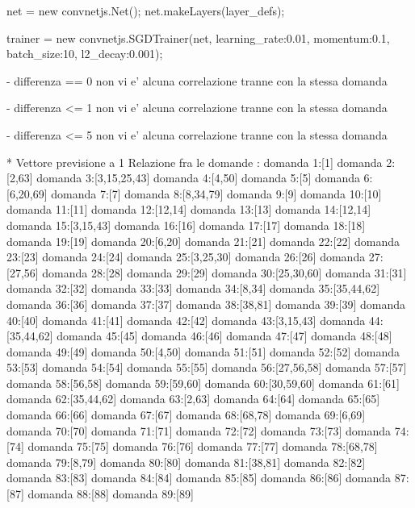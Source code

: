 net = new convnetjs.Net();
net.makeLayers(layer_defs);

trainer = new convnetjs.SGDTrainer(net, {learning_rate:0.01, momentum:0.1, batch_size:10, l2_decay:0.001});

- differenza == 0  non vi e' alcuna correlazione tranne con la stessa domanda

- differenza <= 1  non vi e' alcuna correlazione tranne con la stessa domanda

- differenza <= 5  non vi e' alcuna correlazione tranne con la stessa domanda


* Vettore previsione a 1
Relazione fra le domande :
domanda 1:[1]
domanda 2:[2,63]
domanda 3:[3,15,25,43]
domanda 4:[4,50]
domanda 5:[5]
domanda 6:[6,20,69]
domanda 7:[7]
domanda 8:[8,34,79]
domanda 9:[9]
domanda 10:[10]
domanda 11:[11]
domanda 12:[12,14]
domanda 13:[13]
domanda 14:[12,14]
domanda 15:[3,15,43]
domanda 16:[16]
domanda 17:[17]
domanda 18:[18]
domanda 19:[19]
domanda 20:[6,20]
domanda 21:[21]
domanda 22:[22]
domanda 23:[23]
domanda 24:[24]
domanda 25:[3,25,30]
domanda 26:[26]
domanda 27:[27,56]
domanda 28:[28]
domanda 29:[29]
domanda 30:[25,30,60]
domanda 31:[31]
domanda 32:[32]
domanda 33:[33]
domanda 34:[8,34]
domanda 35:[35,44,62]
domanda 36:[36]
domanda 37:[37]
domanda 38:[38,81]
domanda 39:[39]
domanda 40:[40]
domanda 41:[41]
domanda 42:[42]
domanda 43:[3,15,43]
domanda 44:[35,44,62]
domanda 45:[45]
domanda 46:[46]
domanda 47:[47]
domanda 48:[48]
domanda 49:[49]
domanda 50:[4,50]
domanda 51:[51]
domanda 52:[52]
domanda 53:[53]
domanda 54:[54]
domanda 55:[55]
domanda 56:[27,56,58]
domanda 57:[57]
domanda 58:[56,58]
domanda 59:[59,60]
domanda 60:[30,59,60]
domanda 61:[61]
domanda 62:[35,44,62]
domanda 63:[2,63]
domanda 64:[64]
domanda 65:[65]
domanda 66:[66]
domanda 67:[67]
domanda 68:[68,78]
domanda 69:[6,69]
domanda 70:[70]
domanda 71:[71]
domanda 72:[72]
domanda 73:[73]
domanda 74:[74]
domanda 75:[75]
domanda 76:[76]
domanda 77:[77]
domanda 78:[68,78]
domanda 79:[8,79]
domanda 80:[80]
domanda 81:[38,81]
domanda 82:[82]
domanda 83:[83]
domanda 84:[84]
domanda 85:[85]
domanda 86:[86]
domanda 87:[87]
domanda 88:[88]
domanda 89:[89]


